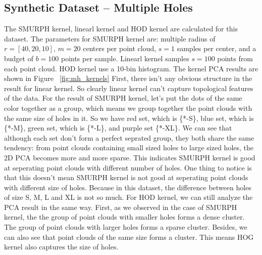 \documentclass[10pt]{article}
\begin{document}
\subsection{Synthetic Dataset -- Multiple Holes}

The SMURPH kernel, linearl kernel and HOD kernel are calculated for this dataset.
The parameters for SMURPH kernel are:  multiple radius of $r = [40,20,10]$, $m = 20$ centers per point cloud, $s = 1$ samples per center, and a budget of $b = 100$ points per sample.
Linearl kernel samples $s=100$ points from each point cloud.
HOD kernel use a 10-bin histogram.
The kernel PCA results are shown in Figure ~\ref{fig:mh_kernels}
First, there isn't any obvious structure in the result for linear kernel.
So clearly linear kernel can't capture topological features of the data.
For the result of SMURPH kernel, let's put the dots of the same color together as a group,
which means we group together the point clouds with the same size of holes in it.
So we have red set, which is \{*-S\}, blue set, which is \{*-M\}, green set, which is \{*-L\}, and purple set \{*-XL\}.
We can see that although each set don't form a perfect seprated group, they both share the same tendency:
from point clouds containing small sized holes to large sized holes, the 2D PCA becomes more and more sparse.
This indicates SMURPH kernel is good at seperating point clouds with different number of holes.
One thing to notice is that this doesn't mean SMURPH kernel is not good at seperating point clouds with different size of holes.
Because in this dataset, the difference between holes of size S, M, L and XL is not so much.
For HOD kernel, we can still analyze the PCA result in the same way.
First, as we observed in the case of SMURPH kernel, the the group of point clouds with smaller holes forms a dense cluster.
The group of point clouds with larger holes forms a sparse cluster.
Besides, we can also see that point clouds of the same size forms a cluster.
This means HOG kernel also captures the size of holes.
\end{document}
